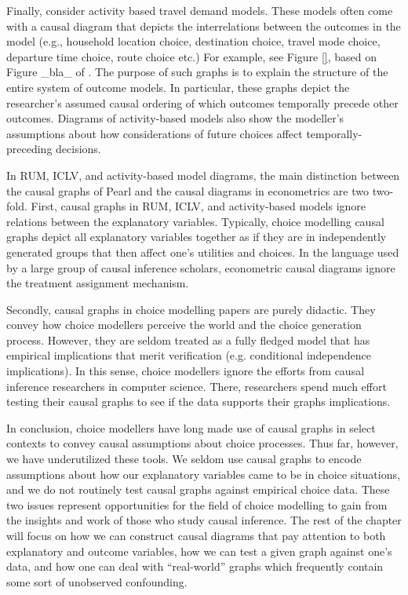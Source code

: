 Finally, consider activity based travel demand models.
These models often come with a causal diagram that depicts the interrelations between the outcomes in the model (e.g., household location choice, destination choice, travel mode choice, departure time choice, route choice etc.)
For example, see Figure \ref{}, based on Figure \_bla\_ of \citet{bradley_2010_sacsim}.
The purpose of such graphs is to explain the structure of the entire system of outcome models.
In particular, these graphs depict the researcher's assumed causal ordering of which outcomes temporally precede other outcomes.
Diagrams of activity-based models also show the modeller's assumptions about how considerations of future choices affect temporally-preceding decisions.

In RUM, ICLV, and activity-based model diagrams, the main distinction between the causal graphs of Pearl \citet{article_name} and the causal diagrams in econometrics are two two-fold.
First, causal graphs in RUM, ICLV, and activity-based models ignore relations between the explanatory variables.
Typically, choice modelling causal graphs depict all explanatory variables together as if they are in independently generated groups that then affect one's utilities and choices.
In the language used by a large group of causal inference scholars, econometric causal diagrams ignore the treatment assignment mechanism.

Secondly, causal graphs in choice modelling papers are purely didactic.
They convey how choice modellers perceive the world and the choice generation process.
However, they are seldom treated as a fully fledged model that has empirical implications that merit verification (e.g. conditional independence implications).
In this sense, choice modellers ignore the efforts from causal inference researchers in computer science.
There, researchers spend much effort testing their causal graphs to see if the data supports their graphs implications.

In conclusion, choice modellers have long made use of causal graphs in select contexts to convey causal assumptions about choice processes.
Thus far, however, we have underutilized these tools.
We seldom use causal graphs to encode assumptions about how our explanatory variables came to be in choice situations, and we do not routinely test causal graphs against empirical choice data.
These two issues represent opportunities for the field of choice modelling to gain from the insights and work of those who study causal inference.
The rest of the chapter will focus on how we can construct causal diagrams that pay attention to both explanatory and outcome variables, how we can test a given graph against one's data, and how one can deal with ``real-world'' graphs which frequently contain some sort of unobserved confounding.
